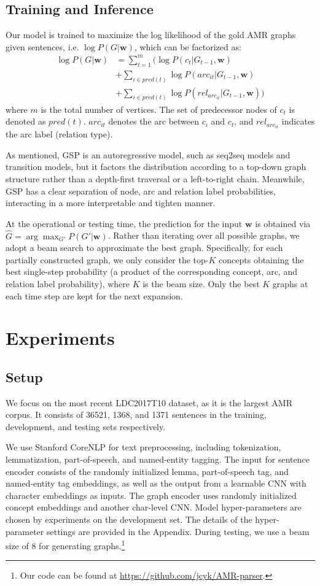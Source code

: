 \documentclass[11pt,a4paper]{article}
\begin{document}
	\subsection{Training and Inference}
	Our model is trained to maximize the log likelihood of the gold AMR graphs given sentences, i.e. $\log P(G|\mathbf{w})$, which can be factorized as:
	\begin{align*}
	\log P(G|\mathbf{w}) &= \sum_{t=1}^m \bigg( \log P(c_t|G_{t-1}, \mathbf{w})  \\
	&+ \sum_{i\in pred(t)}\log P(arc_{it}|G_{t-1}, \mathbf{w}) \\
	& + \sum_{i\in pred(t)}\log P(rel_{arc_{it}}|G_{t-1}, \mathbf{w})\bigg)
	\end{align*}
	where $m$ is the total number of vertices. The set of predecessor nodes of $c_t$ is denoted as $pred(t)$. $arc_{it}$ denotes the arc between $c_i$ and $c_t$, and $rel_{arc_{it}}$ indicates the arc label (relation type).
	
	As mentioned, GSP is an autoregressive model, such as seq2seq models and transition models, but it factors the distribution according to a top-down graph structure rather than a depth-first traversal or a left-to-right chain. Meanwhile, GSP has a clear separation of node, arc and relation label probabilities, interacting in a more interpretable and tighten manner.
	
	At the operational or testing time, the prediction for the input $\mathbf{w}$ is obtained via $\hat{G} = \arg\max_{G'} P(G'|\mathbf{w})$. Rather than iterating over all possible graphs, we adopt a beam search to approximate the best graph. Specifically, for each partially constructed graph, we only consider the top-$K$ concepts obtaining the best single-step probability (a product of the corresponding concept, arc, and relation label probability), where $K$ is the beam size. Only the best $K$ graphs at each time step are kept for the next expansion.
	\section{Experiments}
	\subsection{Setup}
	We focus on the most recent LDC2017T10 dataset, as it is the largest AMR corpus. It consists of 36521, 1368, and 1371 sentences in the training, development, and testing sets respectively.
	
	We use Stanford CoreNLP \cite{manning2014stanford} for text preprocessing, including tokenization, lemmatization, part-of-speech, and named-entity tagging. The input for sentence encoder consists of the randomly initialized lemma, part-of-speech tag, and named-entity tag embeddings, as well as the output from a learnable CNN with character embeddings as inputs. The graph encoder uses randomly initialized concept embeddings and another char-level CNN. Model hyper-parameters are chosen by experiments on the development set. The details of the hyper-parameter settings are provided in the Appendix. During testing, we use a beam size of $8$ for generating graphs.\footnote{Our code can be found at \url{https://github.com/jcyk/AMR-parser}.}
\end{document}
